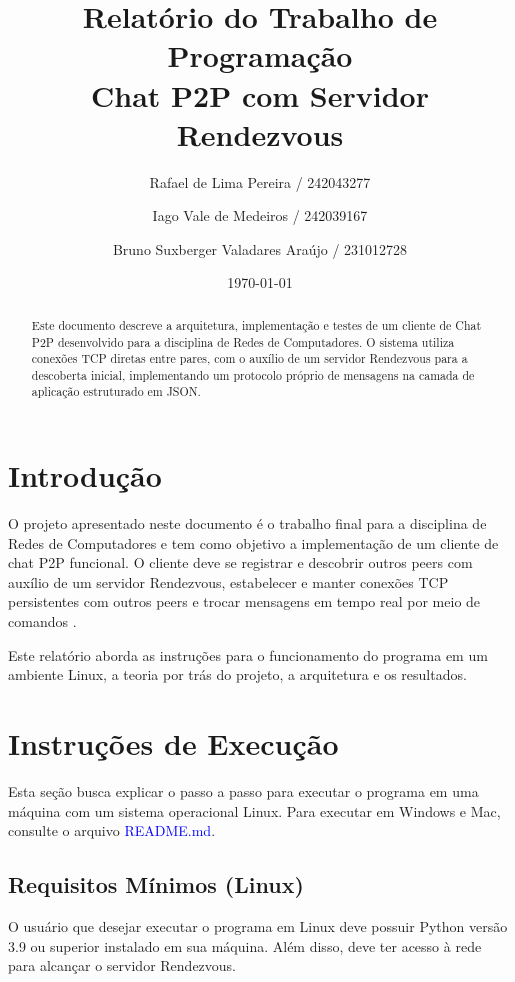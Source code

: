 \documentclass[12pt, a4paper]{article}
\title{\textbf{Relatório do Trabalho de Programação}\\ Chat P2P com Servidor Rendezvous}
\author{
    Rafael de Lima Pereira / 242043277
    \and Iago Vale de Medeiros / 242039167
    \and Bruno Suxberger Valadares Araújo / 231012728
}
\date{\today}
\begin{document}
\maketitle

\begin{abstract}
Este documento descreve a arquitetura, implementação e testes de um cliente de Chat P2P desenvolvido para a disciplina de Redes de Computadores. O sistema utiliza conexões TCP diretas entre pares, com o auxílio de um servidor Rendezvous para a descoberta inicial, implementando um protocolo próprio de mensagens na camada de aplicação estruturado em JSON.
\end{abstract}

\tableofcontents
\newpage

\section{Introdução}
O projeto apresentado neste documento é o trabalho final para a disciplina de Redes de Computadores e tem como objetivo a implementação de um cliente de chat P2P funcional. O cliente deve se registrar e descobrir outros peers com auxílio de um servidor Rendezvous, estabelecer e manter conexões TCP persistentes com outros peers e trocar mensagens em tempo real por meio de comandos \cite{pyp2p}.

Este relatório aborda as instruções para o funcionamento do programa em um ambiente Linux, a teoria por trás do projeto, a arquitetura e os resultados.

\section{Instruções de Execução}
Esta seção busca explicar o passo a passo para executar o programa em uma máquina com um sistema operacional Linux. Para executar em Windows e Mac, consulte o arquivo \textcolor{blue}{README.md}.

\subsection{Requisitos Mínimos (Linux)}
O usuário que desejar executar o programa em Linux deve possuir Python versão 3.9 ou superior instalado em sua máquina. Além disso, deve ter acesso à rede para alcançar o servidor Rendezvous.
\end{document}
